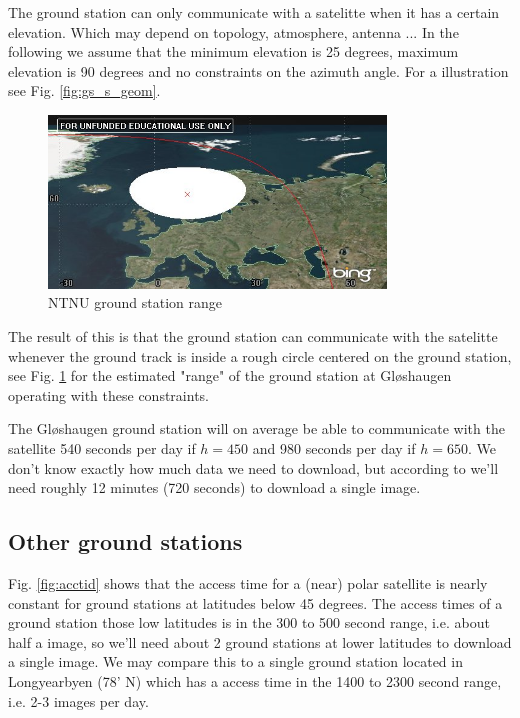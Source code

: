 The ground station can only communicate with a satelitte when it has a certain elevation. Which may depend on topology, atmosphere, antenna ...
In the following we assume that the minimum elevation is 25 degrees, maximum elevation is 90 degrees and no constraints on the azimuth angle.  For a illustration see Fig. \ref{fig:gs_s_geom}.

\begin{figure}
  \begin{center}
    \includegraphics[width=0.8\textwidth]{Figures/ntnu_footprint}
  \end{center}
  \caption[ntnu footprint]{NTNU ground station range}
  \label{fig:ntnu_range}
\end{figure}

The result of this is that the ground station can communicate with the satelitte whenever the ground track is inside a rough circle centered on the ground station, see Fig. \ref{fig:ntnu_range} for the estimated "range" of the ground station at Gløshaugen operating with these constraints.

The Gløshaugen ground station will on average be able to communicate with the satellite 540 seconds per day if $h=450$ and 980 seconds per day if $h=650$. We don't know exactly how much data we need to download, but according to \cite{eks-kom} we'll need roughly 12 minutes (720 seconds) to download a single image. 

\subsection{Other ground stations}
Fig. \ref{fig:acctid} shows that the access time for a (near) polar satellite is nearly constant for ground stations at latitudes below 45 degrees. The access times of a ground station those low latitudes is in the 300 to 500 second range, i.e. about half a image, so we'll need about 2 ground stations at lower latitudes to download a single image. We may compare this to a single ground station located in Longyearbyen (78' N) which has a access time in the 1400 to 2300 second range, i.e. 2-3 images per day. 
